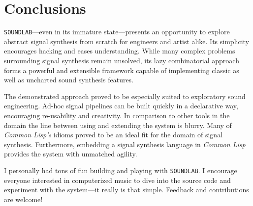 \section{Conclusions}

\texttt{SOUNDLAB}---even in its immature state---presents an opportunity
to explore abstract signal synthesis from scratch for engineers and artist
alike. Its simplicity encourages hacking and eases understanding. While
many complex problems surrounding signal synthesis remain unsolved, its
lazy combinatorial approach forms a powerful and extensible framework
capable of implementing classic as well as uncharted sound synthesis
features.

The demonstrated approach proved to be especially suited to exploratory
sound engineering. Ad-hoc signal pipelines can be built quickly in a
declarative way, encouraging re-usability and creativity. In comparison to
other tools in the domain the line between using and extending the system
is blurry. Many of \textit{Common Lisp's} idioms proved to be an ideal
fit for the domain of signal synthesis. Furthermore, embedding a signal
synthesis language in \textit{Common Lisp} provides the system with
unmatched agility.

I personally had tons of fun building and playing with
\texttt{SOUND\-LAB}. I encourage everyone interested in computerized
music to dive into the source code and experiment with the system---it
really is that simple. Feedback and contributions are welcome!
